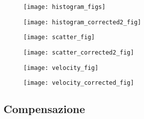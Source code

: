 \begin{figure*}[t!]
	\centering
	\begin{subfigure}{0.5\linewidth}
		\centering
		\texttt{[image: histogram\_figs]}
		\caption{}
	\end{subfigure}\hfill
	\begin{subfigure}{0.5\linewidth}
		\centering
		\texttt{[image: histogram\_corrected2\_fig]}
		\caption{}
	\end{subfigure}
	\caption{}
	\label{fig:histogram}
\end{figure*}

\begin{figure*}[t!]
	\centering
	\begin{subfigure}{0.5\linewidth}
		\centering
		\texttt{[image: scatter\_fig]}
		\caption{}
		\label{fig:scatter_init}
	\end{subfigure}\hfill
	\begin{subfigure}{0.5\linewidth}
		\centering
		\texttt{[image: scatter\_corrected2\_fig]}
		\caption{}
	\end{subfigure}
	\caption{}
	\label{fig:scatter}
\end{figure*}


\begin{figure*}[t!]
	\centering
	\begin{subfigure}{0.5\linewidth}
		\centering
		\texttt{[image: velocity\_fig]}
		\caption{}
	\end{subfigure}\hfill
	\begin{subfigure}{0.5\linewidth}
		\centering
		\texttt{[image: velocity\_corrected\_fig]}
		\caption{}
	\end{subfigure}
	\caption{}
	\label{fig:velocity}
\end{figure*}


\subsection{Compensazione}


